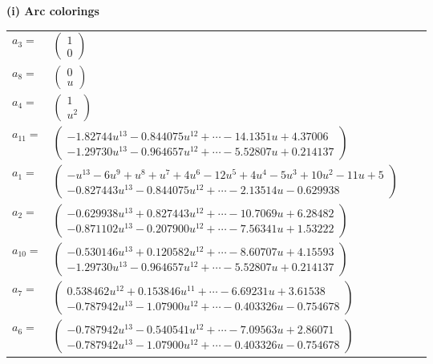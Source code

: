 \documentclass[1p]{elsarticle_modified}
\theoremstyle{definition}
\begin{document}
\flushleft \textbf{(i) Arc colorings}\\
\begin{tabular}{m{7pt} m{180pt} m{7pt} m{180pt} }
\flushright $a_{3}=$&$\begin{pmatrix}1\\0\end{pmatrix}$ \\
\flushright $a_{8}=$&$\begin{pmatrix}0\\u\end{pmatrix}$ \\
\flushright $a_{4}=$&$\begin{pmatrix}1\\u^2\end{pmatrix}$ \\
\flushright $a_{11}=$&$\begin{pmatrix}-1.82744 u^{13}-0.844075 u^{12}+\cdots-14.1351 u+4.37006\\-1.29730 u^{13}-0.964657 u^{12}+\cdots-5.52807 u+0.214137\end{pmatrix}$ \\
\flushright $a_{1}=$&$\begin{pmatrix}- u^{13}-6 u^9+u^8+u^7+4 u^6-12 u^5+4 u^4-5 u^3+10 u^2-11 u+5\\-0.827443 u^{13}-0.844075 u^{12}+\cdots-2.13514 u-0.629938\end{pmatrix}$ \\
\flushright $a_{2}=$&$\begin{pmatrix}-0.629938 u^{13}+0.827443 u^{12}+\cdots-10.7069 u+6.28482\\-0.871102 u^{13}-0.207900 u^{12}+\cdots-7.56341 u+1.53222\end{pmatrix}$ \\
\flushright $a_{10}=$&$\begin{pmatrix}-0.530146 u^{13}+0.120582 u^{12}+\cdots-8.60707 u+4.15593\\-1.29730 u^{13}-0.964657 u^{12}+\cdots-5.52807 u+0.214137\end{pmatrix}$ \\
\flushright $a_{7}=$&$\begin{pmatrix}0.538462 u^{12}+0.153846 u^{11}+\cdots-6.69231 u+3.61538\\-0.787942 u^{13}-1.07900 u^{12}+\cdots-0.403326 u-0.754678\end{pmatrix}$ \\
\flushright $a_{6}=$&$\begin{pmatrix}-0.787942 u^{13}-0.540541 u^{12}+\cdots-7.09563 u+2.86071\\-0.787942 u^{13}-1.07900 u^{12}+\cdots-0.403326 u-0.754678\end{pmatrix}$ \\

\end{tabular}
\end{document}
